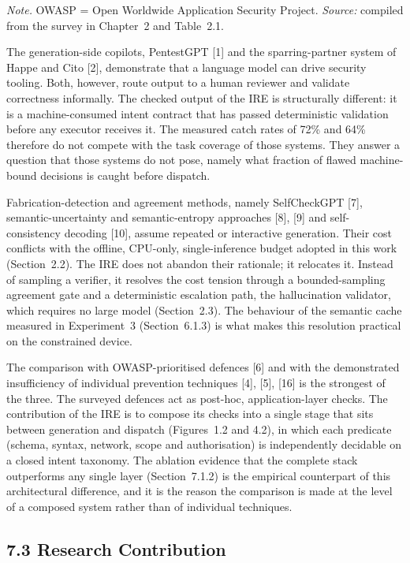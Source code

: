 \documentclass[
]{article}
\begin{document}
\emph{Note.} OWASP = Open Worldwide Application Security Project.
\emph{Source:} compiled from the survey in Chapter~2 and Table~2.1.

The generation-side copilots, PentestGPT {[}1{]} and the
sparring-partner system of Happe and Cito {[}2{]}, demonstrate that a
language model can drive security tooling. Both, however, route output
to a human reviewer and validate correctness informally. The checked
output of the IRE is structurally different: it is a machine-consumed
intent contract that has passed deterministic validation before any
executor receives it. The measured catch rates of 72\% and 64\%
therefore do not compete with the task coverage of those systems. They
answer a question that those systems do not pose, namely what fraction
of flawed machine-bound decisions is caught before dispatch.

Fabrication-detection and agreement methods, namely SelfCheckGPT
{[}7{]}, semantic-uncertainty and semantic-entropy approaches {[}8{]},
{[}9{]} and self-consistency decoding {[}10{]}, assume repeated or
interactive generation. Their cost conflicts with the offline, CPU-only,
single-inference budget adopted in this work (Section~2.2). The IRE does
not abandon their rationale; it relocates it. Instead of sampling a
verifier, it resolves the cost tension through a bounded-sampling
agreement gate and a deterministic escalation path, the hallucination
validator, which requires no large model (Section~2.3). The behaviour of
the semantic cache measured in Experiment~3 (Section~6.1.3) is what
makes this resolution practical on the constrained device.

The comparison with OWASP-prioritised defences {[}6{]} and with the
demonstrated insufficiency of individual prevention techniques {[}4{]},
{[}5{]}, {[}16{]} is the strongest of the three. The surveyed defences
act as post-hoc, application-layer checks. The contribution of the IRE
is to compose its checks into a single stage that sits between
generation and dispatch (Figures~1.2 and 4.2), in which each predicate
(schema, syntax, network, scope and authorisation) is independently
decidable on a closed intent taxonomy. The ablation evidence that the
complete stack outperforms any single layer (Section~7.1.2) is the
empirical counterpart of this architectural difference, and it is the
reason the comparison is made at the level of a composed system rather
than of individual techniques.

\hypertarget{research-contribution}{%
\subsection{7.3 Research Contribution}\label{research-contribution}}
\end{document}
